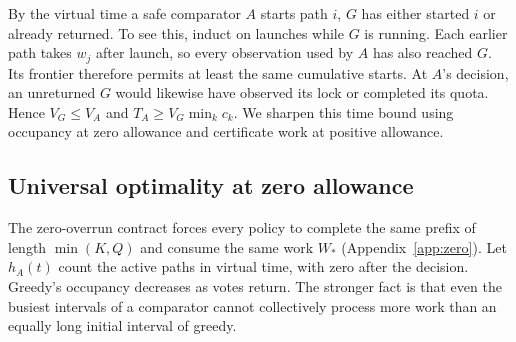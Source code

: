 \documentclass{article}
\begin{document}
By the virtual time a safe comparator \(A\) starts path \(i\), \(G\) has either started \(i\) or already returned. To see this, induct on launches while \(G\) is running. Each earlier path takes \(w_j\) after launch, so every observation used by \(A\) has also reached \(G\). Its frontier therefore permits at least the same cumulative starts. At \(A\)'s decision, an unreturned \(G\) would likewise have observed its lock or completed its quota. Hence \(V_G\le V_A\) and \(T_A\ge V_G\min_k c_k\). We sharpen this time bound using occupancy at zero allowance and certificate work at positive allowance.

\subsection{Universal optimality at zero allowance}
The zero-overrun contract forces every policy to complete the same prefix of length $\min(K,Q)$ and consume the same work $W_*$ (Appendix~\ref{app:zero}). Let $h_A(t)$ count the active paths in virtual time, with zero after the decision. Greedy's occupancy decreases as votes return. The stronger fact is that even the busiest intervals of a comparator cannot collectively process more work than an equally long initial interval of greedy.
\end{document}
